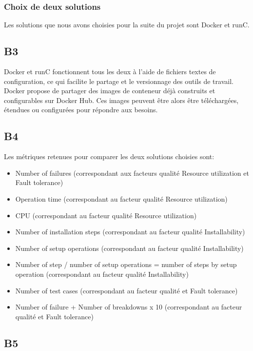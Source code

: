     \subsubsection*{Choix de deux solutions}
    Les solutions que nous avons choisies pour la suite du projet sont Docker et runC.

\subsection*{B3}
    Docker et runC fonctionnent tous les deux à l'aide de fichiers textes de configuration, ce qui facilite le partage et le versionnage des outils de travail. Docker propose de partager des images de conteneur déjà construits et configurables sur Docker Hub. Ces images peuvent être alors être téléchargées, étendues ou configurées pour répondre aux besoins.


\subsection*{B4}
    Les métriques retenues pour comparer les deux solutions choisies sont:
    \begin{itemize}
        \item Number of failures (correspondant aux facteurs qualité Resource utilization et Fault tolerance)
        \item Operation time (correspondant au facteur qualité Resource utilization)
        \item CPU (correspondant au facteur qualité Resource utilization)
        \item Number of installation steps (correspondant au facteur qualité Installability)
        \item Number of setup operations (correspondant au facteur qualité Installability)
        \item Number of step / number of setup operations = number of steps by setup operation (correspondant au facteur qualité Installability)
        \item Number of test cases (correspondant au facteur qualité et Fault tolerance)
        \item Number of failure + Number of breakdowns x 10 (correspondant au facteur qualité et Fault tolerance)
    \end{itemize}

\subsection*{B5}

